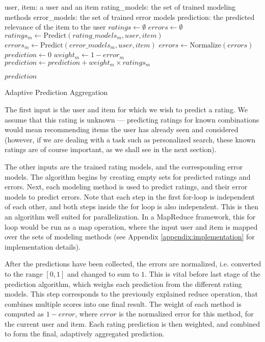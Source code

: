 \begin{algorithm}
  \begin{algorithmic}[1]
  \REQUIRE user, item: a user and an item
  \REQUIRE rating\_models: the set of trained modeling methods 
  \REQUIRE error\_models: the set of trained error models
  \ENSURE  prediction: the predicted relevance of the item to the user
    \STATE $ratings \gets \emptyset$
    \STATE $errors  \gets \emptyset$
      \STATE $ratings_{m} \gets \mathrm{Predict}(rating\_models_m, user, item)$
      \STATE $errors_{m}  \gets \mathrm{Predict}(error\_models_m, user, item)$
    \ENDFOR 
    \STATE $errors \gets \mathrm{Normalize}(errors)$
    \STATE $prediction \gets 0$
      \STATE $weight_m \gets 1 - error_m$
      \STATE $prediction \gets prediction + weight_m \times ratings_m$
    \ENDFOR
 
  \RETURN $prediction$
  \end{algorithmic}
  \caption[Adaptive Prediction Aggregation]{Adaptive Prediction Aggregation
  }
  \label{code:prediction}
\end{algorithm}

The first input is the user and item for which we wish to predict a rating.
We assume that this rating is unknown --- predicting ratings for known combinations
would mean recommending items the user has already seen and considered
(however, if we are dealing with a task such as personalized search,
these known ratings are of course important, as we shall see in the next section).

The other inputs are the trained rating models, and the corresponding error models.
The algorithm begins by creating empty sets for predicted ratings and errors.
Next, each modeling method is used to predict ratings, and their error models to predict errors.
Note that each step in the first for-loop is independent of each other, and both steps
inside the for loop is also independent. This is then an algorithm well suited for
parallelization.
In a MapReduce framework, this for loop would be run as a $\mathrm{map}$ operation,
where the input user and item is mapped over the sets of modeling methods
(see Appendix \ref{appendix:implementation} for implementation details).

After the predictions have been collected, the errors are normalized,
i.e. converted to the range $[0,1]$ and changed to sum to $1$.
This is vital before last stage of the prediction algorithm,
which weighs each prediction from the different rating models.
This step corresponds to the previously explained $\mathrm{reduce}$ operation,
that combines multiple scores into one final result.
The weight of each method is computed as $1 - error$, where $error$ 
is the normalized error for this method, for the current user and item.
Each rating prediction is then weighted, and combined to form the final,
adaptively aggregated prediction.

